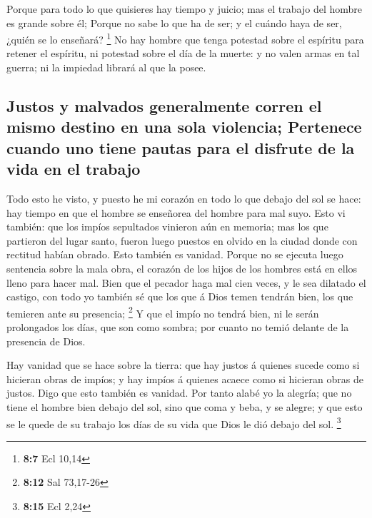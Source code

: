  Porque para todo lo que quisieres hay tiempo y juicio;
mas el trabajo del hombre es grande sobre él;  Porque no
sabe lo que ha de ser; y el cuándo haya de ser, ¿quién se lo enseñará?
\footnote{\textbf{8:7} Ecl 10,14}  No hay hombre que tenga
potestad sobre el espíritu para retener el espíritu, ni potestad sobre
el día de la muerte: y no valen armas en tal guerra; ni la impiedad
librará al que la posee.

\hypertarget{justos-y-malvados-generalmente-corren-el-mismo-destino-en-una-sola-violencia-pertenece-cuando-uno-tiene-pautas-para-el-disfrute-de-la-vida-en-el-trabajo}{%
\subsection{Justos y malvados generalmente corren el mismo destino en
una sola violencia; Pertenece cuando uno tiene pautas para el disfrute
de la vida en el
trabajo}\label{justos-y-malvados-generalmente-corren-el-mismo-destino-en-una-sola-violencia-pertenece-cuando-uno-tiene-pautas-para-el-disfrute-de-la-vida-en-el-trabajo}}

 Todo esto he visto, y puesto he mi corazón en todo lo que
debajo del sol se hace: hay tiempo en que el hombre se enseñorea del
hombre para mal suyo.  Esto vi también: que los impíos
sepultados vinieron aún en memoria; mas los que partieron del lugar
santo, fueron luego puestos en olvido en la ciudad donde con rectitud
habían obrado. Esto también es vanidad.  Porque no se
ejecuta luego sentencia sobre la mala obra, el corazón de los hijos de
los hombres está en ellos lleno para hacer mal.  Bien que
el pecador haga mal cien veces, y le sea dilatado el castigo, con todo
yo también sé que los que á Dios temen tendrán bien, los que temieren
ante su presencia; \footnote{\textbf{8:12} Sal 73,17-26} 
Y que el impío no tendrá bien, ni le serán prolongados los días, que son
como sombra; por cuanto no temió delante de la presencia de Dios.

 Hay vanidad que se hace sobre la tierra: que hay justos
á quienes sucede como si hicieran obras de impíos; y hay impíos á
quienes acaece como si hicieran obras de justos. Digo que esto también
es vanidad.  Por tanto alabé yo la alegría; que no tiene
el hombre bien debajo del sol, sino que coma y beba, y se alegre; y que
esto se le quede de su trabajo los días de su vida que Dios le dió
debajo del sol. \footnote{\textbf{8:15} Ecl 2,24}

